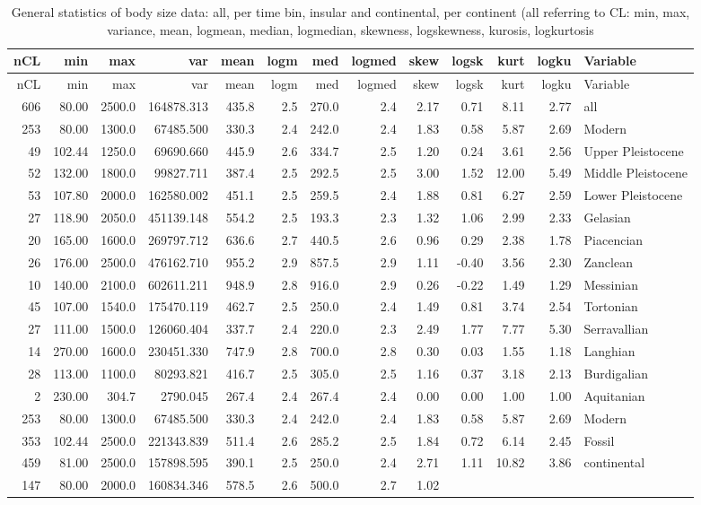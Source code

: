 \documentclass[]{article}
\begin{document}
\begin{longtable}[]{@{}rrrrrrrrrrrrl@{}}
\caption{General statistics of body size data: all, per time bin,
insular and continental, per continent (all referring to CL: min, max,
variance, mean, logmean, median, logmedian, skewness, logskewness,
kurosis, logkurtosis}\tabularnewline
\toprule
nCL & min & max & var & mean & logm & med & logmed & skew & logsk & kurt
& logku & Variable\tabularnewline
\midrule
\endfirsthead
\toprule
nCL & min & max & var & mean & logm & med & logmed & skew & logsk & kurt
& logku & Variable\tabularnewline
\midrule
\endhead
606 & 80.00 & 2500.0 & 164878.313 & 435.8 & 2.5 & 270.0 & 2.4 & 2.17 &
0.71 & 8.11 & 2.77 & all\tabularnewline
253 & 80.00 & 1300.0 & 67485.500 & 330.3 & 2.4 & 242.0 & 2.4 & 1.83 &
0.58 & 5.87 & 2.69 & Modern\tabularnewline
49 & 102.44 & 1250.0 & 69690.660 & 445.9 & 2.6 & 334.7 & 2.5 & 1.20 &
0.24 & 3.61 & 2.56 & Upper Pleistocene\tabularnewline
52 & 132.00 & 1800.0 & 99827.711 & 387.4 & 2.5 & 292.5 & 2.5 & 3.00 &
1.52 & 12.00 & 5.49 & Middle Pleistocene\tabularnewline
53 & 107.80 & 2000.0 & 162580.002 & 451.1 & 2.5 & 259.5 & 2.4 & 1.88 &
0.81 & 6.27 & 2.59 & Lower Pleistocene\tabularnewline
27 & 118.90 & 2050.0 & 451139.148 & 554.2 & 2.5 & 193.3 & 2.3 & 1.32 &
1.06 & 2.99 & 2.33 & Gelasian\tabularnewline
20 & 165.00 & 1600.0 & 269797.712 & 636.6 & 2.7 & 440.5 & 2.6 & 0.96 &
0.29 & 2.38 & 1.78 & Piacencian\tabularnewline
26 & 176.00 & 2500.0 & 476162.710 & 955.2 & 2.9 & 857.5 & 2.9 & 1.11 &
-0.40 & 3.56 & 2.30 & Zanclean\tabularnewline
10 & 140.00 & 2100.0 & 602611.211 & 948.9 & 2.8 & 916.0 & 2.9 & 0.26 &
-0.22 & 1.49 & 1.29 & Messinian\tabularnewline
45 & 107.00 & 1540.0 & 175470.119 & 462.7 & 2.5 & 250.0 & 2.4 & 1.49 &
0.81 & 3.74 & 2.54 & Tortonian\tabularnewline
27 & 111.00 & 1500.0 & 126060.404 & 337.7 & 2.4 & 220.0 & 2.3 & 2.49 &
1.77 & 7.77 & 5.30 & Serravallian\tabularnewline
14 & 270.00 & 1600.0 & 230451.330 & 747.9 & 2.8 & 700.0 & 2.8 & 0.30 &
0.03 & 1.55 & 1.18 & Langhian\tabularnewline
28 & 113.00 & 1100.0 & 80293.821 & 416.7 & 2.5 & 305.0 & 2.5 & 1.16 &
0.37 & 3.18 & 2.13 & Burdigalian\tabularnewline
2 & 230.00 & 304.7 & 2790.045 & 267.4 & 2.4 & 267.4 & 2.4 & 0.00 & 0.00
& 1.00 & 1.00 & Aquitanian\tabularnewline
253 & 80.00 & 1300.0 & 67485.500 & 330.3 & 2.4 & 242.0 & 2.4 & 1.83 &
0.58 & 5.87 & 2.69 & Modern\tabularnewline
353 & 102.44 & 2500.0 & 221343.839 & 511.4 & 2.6 & 285.2 & 2.5 & 1.84 &
0.72 & 6.14 & 2.45 & Fossil\tabularnewline
459 & 81.00 & 2500.0 & 157898.595 & 390.1 & 2.5 & 250.0 & 2.4 & 2.71 &
1.11 & 10.82 & 3.86 & continental\tabularnewline
147 & 80.00 & 2000.0 & 160834.346 & 578.5 & 2.6 & 500.0 & 2.7 & 1.02 &

\end{longtable}
\end{document}
